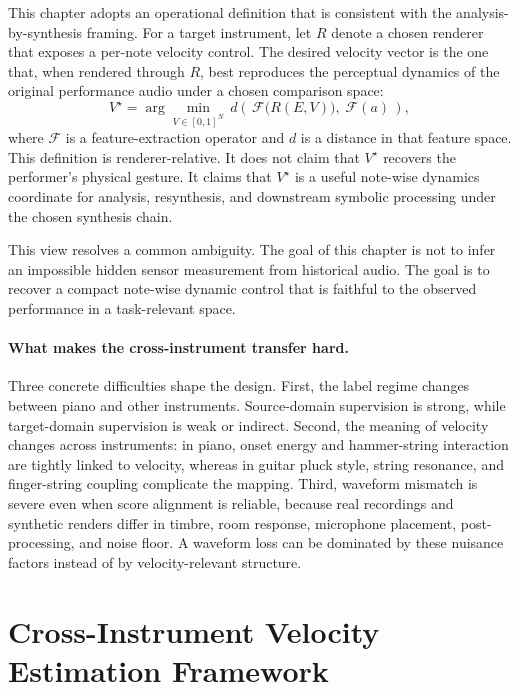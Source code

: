 This chapter adopts an operational definition that is consistent with the analysis-by-synthesis framing. For a target instrument, let $R$ denote a chosen renderer that exposes a per-note velocity control. The desired velocity vector is the one that, when rendered through $R$, best reproduces the perceptual dynamics of the original performance audio under a chosen comparison space:
\begin{equation}
V^{\star} = \arg\min_{V \in [0,1]^{N}}
\, d\!\left(\,\mathcal{F}\!\bigl(R(E, V)\bigr),\; \mathcal{F}(a)\,\right),
\label{eq:bp_latent_velocity}
\end{equation}
where $\mathcal{F}$ is a feature-extraction operator and $d$ is a distance in that feature space. This definition is renderer-relative. It does not claim that $V^{\star}$ recovers the performer's physical gesture. It claims that $V^{\star}$ is a useful note-wise dynamics coordinate for analysis, resynthesis, and downstream symbolic processing under the chosen synthesis chain.

This view resolves a common ambiguity. The goal of this chapter is not to infer an impossible hidden sensor measurement from historical audio. The goal is to recover a compact note-wise dynamic control that is faithful to the observed performance in a task-relevant space.

\paragraph{What makes the cross-instrument transfer hard.}
Three concrete difficulties shape the design. First, the label regime changes between piano and other instruments. Source-domain supervision is strong, while target-domain supervision is weak or indirect. Second, the meaning of velocity changes across instruments: in piano, onset energy and hammer-string interaction are tightly linked to velocity, whereas in guitar pluck style, string resonance, and finger-string coupling complicate the mapping. Third, waveform mismatch is severe even when score alignment is reliable, because real recordings and synthetic renders differ in timbre, room response, microphone placement, post-processing, and noise floor. A waveform loss can be dominated by these nuisance factors instead of by velocity-relevant structure.

\section{Cross-Instrument Velocity Estimation Framework}
\label{sec:bp:framework}

